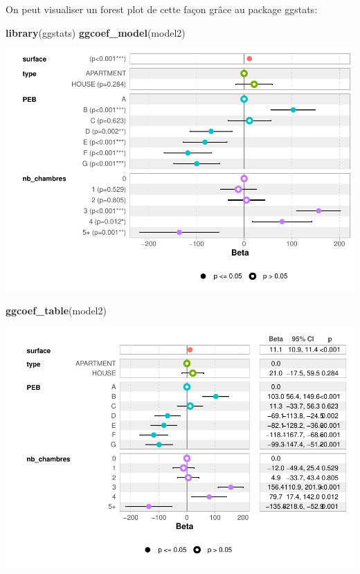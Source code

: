 \documentclass[
]{book}
\newenvironment{Shaded}{\begin{snugshade}}{\end{snugshade}}
\newcommand{\FunctionTok}[1]{\textcolor[rgb]{0.13,0.29,0.53}{\textbf{#1}}}
\newcommand{\NormalTok}[1]{#1}
\begin{document}
On peut visualiser un forest plot de cette façon grâce au package
ggstats:

\begin{Shaded}
\begin{Highlighting}[]
\FunctionTok{library}\NormalTok{(ggstats)}
\FunctionTok{ggcoef\_model}\NormalTok{(model2)}
\end{Highlighting}
\end{Shaded}

\includegraphics{bookdown-demo_files/figure-latex/unnamed-chunk-20-1.pdf}

\begin{Shaded}
\begin{Highlighting}[]
\FunctionTok{ggcoef\_table}\NormalTok{(model2)}
\end{Highlighting}
\end{Shaded}

\includegraphics{bookdown-demo_files/figure-latex/unnamed-chunk-20-2.pdf}
\end{document}
